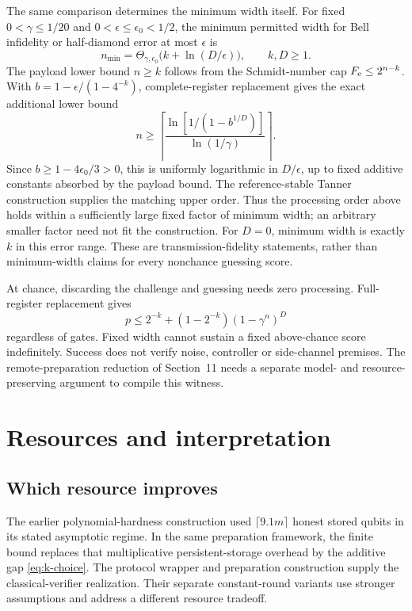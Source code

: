 \documentclass[11pt,a4paper]{article}
\newcommand{\newsection}[1]{\section{#1}}
\begin{document}
The same comparison determines the minimum width itself. For fixed $0<\gamma\le1/20$ and $0<\epsilon\le\epsilon_0<1/2$, the minimum permitted width for Bell infidelity or half-diamond error at most $\epsilon$ is
\[
n_{\min}=\Theta_{\gamma,\epsilon_0}\bigl(k+\ln(D/\epsilon)\bigr),\qquad k,D\ge1.
\]
The payload lower bound $n\ge k$ follows from the Schmidt-number cap $F_{\rm e}\le2^{n-k}$. With $b=1-\epsilon/(1-4^{-k})$, complete-register replacement gives the exact additional lower bound
\[
n\ge\left\lceil\frac{\ln[1/(1-b^{1/D})]}{\ln(1/\gamma)}\right\rceil.
\]
Since $b\ge1-4\epsilon_0/3>0$, this is uniformly logarithmic in $D/\epsilon$, up to fixed additive constants absorbed by the payload bound. The reference-stable Tanner construction supplies the matching upper order. Thus the processing order above holds within a sufficiently large fixed factor of minimum width; an arbitrary smaller factor need not fit the construction. For $D=0$, minimum width is exactly $k$ in this error range. These are transmission-fidelity statements, rather than minimum-width claims for every nonchance guessing score.

At chance, discarding the challenge and guessing needs zero processing. Full-register replacement gives
\[
p\le2^{-k}+(1-2^{-k})(1-\gamma^n)^D
\]
regardless of gates. Fixed width cannot sustain a fixed above-chance score indefinitely. Success does not verify noise, controller or side-channel premises. The remote-preparation reduction of Section~11 needs a separate model- and resource-preserving argument to compile this witness.

\newsection{Resources and interpretation}
\subsection{Which resource improves}
The earlier polynomial-hardness construction used $\lceil9.1m\rceil$ honest stored qubits in its stated asymptotic regime. In the same preparation framework, the finite bound replaces that multiplicative persistent-storage overhead by the additive gap \eqref{eq:k-choice}. The protocol wrapper and preparation construction supply the classical-verifier realization. Their separate constant-round variants use stronger assumptions and address a different resource tradeoff.
\end{document}
